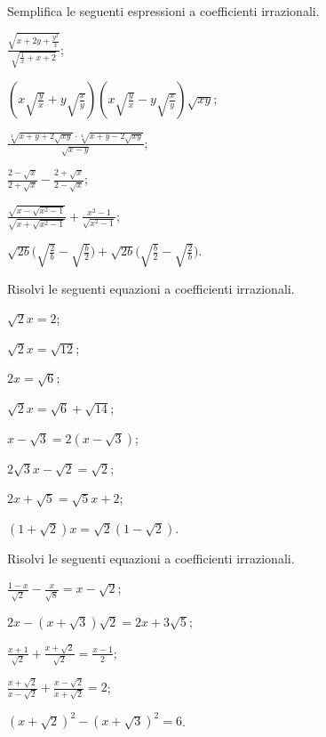 \begin{esercizio}[\Ast]
 \label{ese:2.100}
Semplifica le seguenti espressioni a coefficienti irrazionali.
 \begin{multicols}{2}
 \begin{enumeratea}
 \item $\frac{\sqrt{x+2y+\frac{y^{2}}{x}}}{\sqrt{\frac{1}{x}+x+2}}$;
 \item $\left(x\sqrt{\frac{y}{x}}+y\sqrt{\frac{x}{y}}\right)\left(x\sqrt{\frac{y}{x}}-y\sqrt{\frac{x}{y}}\right)\sqrt{xy}$;
 \item $\frac{\sqrt[4]{x+y+2\sqrt{xy}}\cdot\sqrt[4]{x+y-2\sqrt{xy}}}{\sqrt{x-y}}$;
 \item $\frac{2-\sqrt{x}}{2+\sqrt{x}}-\frac{2+\sqrt{x}}{2-\sqrt{x}}$;
 \item $\frac{\sqrt{x-\sqrt{x^{2}-1}}}{\sqrt{x+\sqrt{x^{2}-1}}}+\frac{x^{2}-1}{\sqrt{x^{2}-1}}$;
 \item $\sqrt{2b}\big(\sqrt{\frac{2}{b}}-\sqrt{\frac{b}{2}} \big)+\sqrt{2b}\big(\sqrt{\frac{b}{2}}-\sqrt{\frac{2}{b}}\big)$.
 \end{enumeratea}
 \end{multicols}
\end{esercizio}

\begin{esercizio}[\Ast]
 \label{ese:2.101}
Risolvi le seguenti equazioni a coefficienti irrazionali.
 \begin{multicols}{2}
 \begin{enumeratea}
 \item $\sqrt 2x=2$;
 \item $\sqrt 2x=\sqrt{12}$;
 \item $2x=\sqrt 6$;
 \item $\sqrt 2x=\sqrt 6+\sqrt{14}$;
 \item $x-\sqrt 3=2\left(x-\sqrt 3\right)$;
 \item $2\sqrt 3x-\sqrt 2=\sqrt 2$;
 \item $2x+\sqrt 5=\sqrt 5x+2$;
 \item $(1+\sqrt 2)x=\sqrt 2(1-\sqrt 2)$.
 \end{enumeratea}
 \end{multicols}
\end{esercizio}

\begin{esercizio}[\Ast]
 \label{ese:2.102}
Risolvi le seguenti equazioni a coefficienti irrazionali.
 \begin{multicols}{2}
 \begin{enumeratea}
 \item $\frac{1-x}{\sqrt 2}-\frac x{\sqrt 8}=x-\sqrt 2$;
 \item $2x-\left(x+\sqrt 3\right)\sqrt 2=2x+3\sqrt 5$;
 \item $\frac{x+1}{\sqrt 2}+\frac{x+\sqrt 2}{\sqrt 2}=\frac{x-1} 2$;
 \item $\frac{x+\sqrt 2}{x-\sqrt 2}+\frac{x-\sqrt 2}{x+\sqrt 2}=2$;
 \item $(x+\sqrt 2)^2-(x+\sqrt 3)^2=6$.
 \end{enumeratea}
 \end{multicols}
\end{esercizio}


